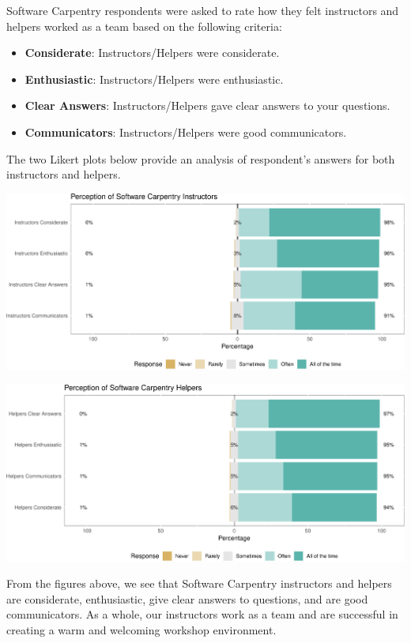 \documentclass[]{article}
\providecommand{\tightlist}{%
  \setlength{\itemsep}{0pt}\setlength{\parskip}{0pt}}
\begin{document}
Software Carpentry respondents were asked to rate how they felt
instructors and helpers worked as a team based on the following
criteria:

\begin{itemize}
\tightlist
\item
  \textbf{Considerate}: Instructors/Helpers were considerate.
\item
  \textbf{Enthusiastic}: Instructors/Helpers were enthusiastic.
\item
  \textbf{Clear Answers}: Instructors/Helpers gave clear answers to your
  questions.
\item
  \textbf{Communicators}: Instructors/Helpers were good communicators.
\end{itemize}

The two Likert plots below provide an analysis of respondent's answers
for both instructors and helpers.

\includegraphics[width=720]{figures/swc-perception-instructors-1}

\includegraphics[width=720]{figures/swc-perception-helpers-1}

From the figures above, we see that Software Carpentry instructors and
helpers are considerate, enthusiastic, give clear answers to questions,
and are good communicators. As a whole, our instructors work as a team
and are successful in creating a warm and welcoming workshop
environment.
\end{document}
